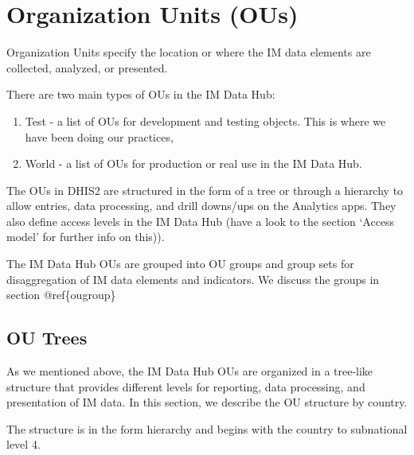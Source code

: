 \documentclass[]{book}
\providecommand{\tightlist}{%
  \setlength{\itemsep}{0pt}\setlength{\parskip}{0pt}}
\begin{document}
\hypertarget{organization-units-ous}{%
\section{Organization Units (OUs)}\label{organization-units-ous}}

Organization Units specify the location or where the IM data elements are collected, analyzed, or presented.

There are two main types of OUs in the IM Data Hub:

\begin{enumerate}
\def\labelenumi{\arabic{enumi}.}
\tightlist
\item
  Test - a list of OUs for development and testing objects. This is where we have been doing our practices,
\item
  World - a list of OUs for production or real use in the IM Data Hub.
\end{enumerate}

The OUs in DHIS2 are structured in the form of a tree or through a hierarchy to allow entries, data processing, and drill downs/ups on the Analytics apps. They also define access levels in the IM Data Hub (have a look to the section `Access model' for further info on this)).

The IM Data Hub OUs are grouped into OU groups and group sets for disaggregation of IM data elements and indicators. We discuss the groups in section @ref\{ougroup\}

\hypertarget{ou-trees}{%
\subsection{OU Trees}\label{ou-trees}}

As we mentioned above, the IM Data Hub OUs are organized in a tree-like structure that provides different levels for reporting, data processing, and presentation of IM data. In this section, we describe the OU structure by country.

The structure is in the form hierarchy and begins with the country to subnational level 4.
\end{document}
